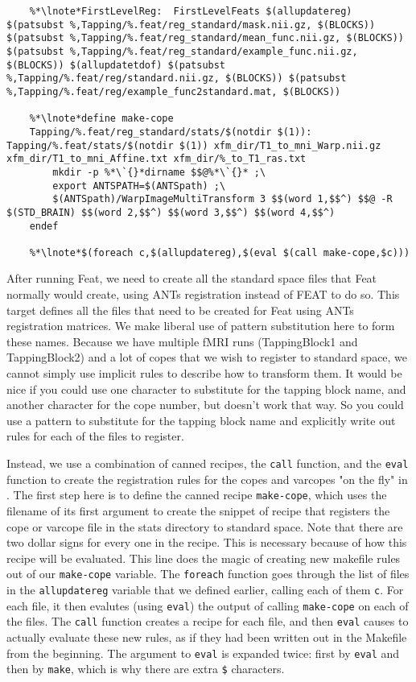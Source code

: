 \begin{lstlisting}
	%*\lnote*FirstLevelReg:  FirstLevelFeats $(allupdatereg) $(patsubst %,Tapping/%.feat/reg_standard/mask.nii.gz, $(BLOCKS))  $(patsubst %,Tapping/%.feat/reg_standard/mean_func.nii.gz, $(BLOCKS)) $(patsubst %,Tapping/%.feat/reg_standard/example_func.nii.gz, $(BLOCKS)) $(allupdatetdof) $(patsubst %,Tapping/%.feat/reg/standard.nii.gz, $(BLOCKS)) $(patsubst %,Tapping/%.feat/reg/example_func2standard.mat, $(BLOCKS)) 

	%*\lnote*define make-cope
	Tapping/%.feat/reg_standard/stats/$(notdir $(1)): Tapping/%.feat/stats/$(notdir $(1)) xfm_dir/T1_to_mni_Warp.nii.gz xfm_dir/T1_to_mni_Affine.txt xfm_dir/%_to_T1_ras.txt
		mkdir -p %*\`{}*dirname $$@%*\`{}* ;\
		export ANTSPATH=$(ANTSpath) ;\
		$(ANTSpath)/WarpImageMultiTransform 3 $$(word 1,$$^) $$@ -R $(STD_BRAIN) $$(word 2,$$^) $$(word 3,$$^) $$(word 4,$$^)
	endef

	%*\lnote*$(foreach c,$(allupdatereg),$(eval $(call make-cope,$c)))
\end{lstlisting}
After running Feat, we need to create all the standard space files
that Feat normally would create, using ANTs registration instead of
FEAT to do so. \lnum{14} This target defines all the files that need to be created for Feat using
ANTs registration matrices. We make liberal use of pattern
substitution here to form these names.  Because we have
multiple fMRI runs (TappingBlock1 and TappingBlock2) and a lot of
copes that we wish to register to standard space, we cannot simply use
implicit rules to describe how to transform them. It would be nice if
you could use one character to substitute for the tapping block name,
and another character for the cope number, but \maken{} doesn't work
that way. So you could use a pattern to substitute for the tapping
block name and explicitly write out rules for each of the files to
register. 

Instead, we use a combination of canned recipes, the \texttt{call}
function, and the \texttt{eval} function to create the registration
rules for the copes and varcopes "on the fly" in \maken{}. The first
step here is to define the canned recipe \texttt{make-cope}, which
uses the filename of its first argument to create the snippet of
recipe that registers the cope or varcope file in the stats directory
to standard space. Note that there are two dollar signs for every one
in the recipe. This is necessary because of how this recipe will be
evaluated. \lnum{16} This line does the magic of creating new makefile
rules out of our \texttt{make-cope} variable. The \texttt{foreach}
function goes through the list of files in the \texttt{allupdatereg}
variable that we defined earlier, calling each of them \texttt{c}. For
each file, it then evalutes (using \texttt{eval}) the output of
calling \texttt{make-cope} on each of the files.  The \texttt{call}
function creates a \maken{} recipe for each file, and then
\texttt{eval} causes \maken{} to actually evaluate these new rules, as
if they had been written out in the Makefile from the beginning. 
The argument to \texttt{eval} is expanded twice: first by
\texttt{eval} and then by \texttt{make}, which is why there are extra
\texttt{\$} characters. 

